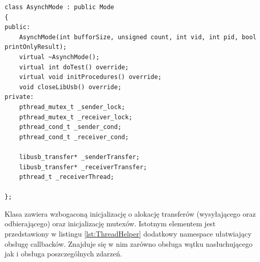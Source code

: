 \documentclass{BscUS}
\begin{document}
\begin{lstlisting}[caption={Deklaracja klasy AsynchMode},label={lst:CAsynchMode}]
class AsynchMode : public Mode
{
public:
	AsynchMode(int bufforSize, unsigned count, int vid, int pid, bool printOnlyResult);
	virtual ~AsynchMode();
	virtual int doTest() override;
	virtual void initProcedures() override;
	void closeLibUsb() override;
private:
	pthread_mutex_t _sender_lock;
	pthread_mutex_t _receiver_lock;
	pthread_cond_t _sender_cond;
	pthread_cond_t _receiver_cond;

	libusb_transfer* _senderTransfer;
	libusb_transfer* _receiverTransfer;
	pthread_t _receiverThread;

};
\end{lstlisting}
Klasa zawiera wzbogaconą inicjalizację o alokację transferów (wysyłającego oraz odbierającego) oraz inicjalizację mutexów.
\newline
Istotnym elementem jest przedstawiony w listingu \ref{lst:ThreadHelper} dodatkowy namespace ułatwiający obsługę callbacków. Znajduje się w nim zarówno obsługa wątku nasłuchującego jak i obsługa poszczególnych zdarzeń.
\end{document}
